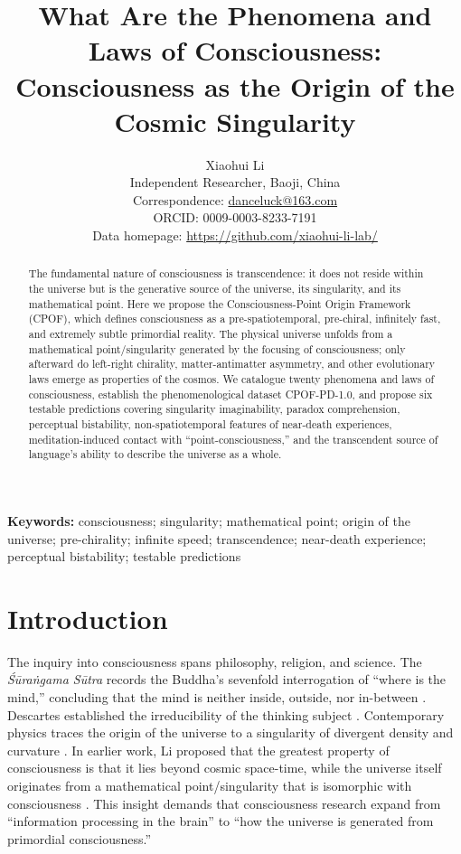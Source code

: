\documentclass[11pt,a4paper]{article}
\title{\textbf{What Are the Phenomena and Laws of Consciousness:} \\ \textbf{Consciousness as the Origin of the Cosmic Singularity}}
\author{Xiaohui Li\\
Independent Researcher, Baoji, China\\
Correspondence: \href{mailto:danceluck@163.com}{danceluck@163.com}\\
ORCID: 0009-0003-8233-7191\\
Data homepage: \url{https://github.com/xiaohui-li-lab/}}
\date{}
\begin{document}
\maketitle

\begin{abstract}
The fundamental nature of consciousness is transcendence: it does not reside within the universe but is the generative source of the universe, its singularity, and its mathematical point. Here we propose the Consciousness-Point Origin Framework (CPOF), which defines consciousness as a pre-spatiotemporal, pre-chiral, infinitely fast, and extremely subtle primordial reality. The physical universe unfolds from a mathematical point/singularity generated by the focusing of consciousness; only afterward do left-right chirality, matter-antimatter asymmetry, and other evolutionary laws emerge as properties of the cosmos. We catalogue twenty phenomena and laws of consciousness, establish the phenomenological dataset CPOF-PD-1.0, and propose six testable predictions covering singularity imaginability, paradox comprehension, perceptual bistability, non-spatiotemporal features of near-death experiences, meditation-induced contact with ``point-consciousness,'' and the transcendent source of language's ability to describe the universe as a whole.
\end{abstract}

\noindent\textbf{Keywords:} consciousness; singularity; mathematical point; origin of the universe; pre-chirality; infinite speed; transcendence; near-death experience; perceptual bistability; testable predictions

\section{Introduction}

The inquiry into consciousness spans philosophy, religion, and science. The \textit{Śūraṅgama Sūtra} records the Buddha's sevenfold interrogation of ``where is the mind,'' concluding that the mind is neither inside, outside, nor in-between \cite{surangama}. Descartes established the irreducibility of the thinking subject \cite{descartes1641}. Contemporary physics traces the origin of the universe to a singularity of divergent density and curvature \cite{hawking1973}. In earlier work, Li proposed that the greatest property of consciousness is that it lies beyond cosmic space-time, while the universe itself originates from a mathematical point/singularity that is isomorphic with consciousness \cite{lix2026point,lix2026language}. This insight demands that consciousness research expand from ``information processing in the brain'' to ``how the universe is generated from primordial consciousness.''
\end{document}
